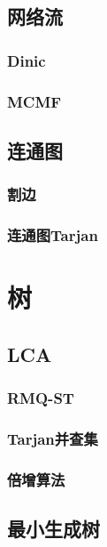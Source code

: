 \documentclass{ctexart}
\begin{document}
\subsection{网络流}
\subsubsection{Dinic}

\subsubsection{MCMF}

\subsection{连通图}
\subsubsection{割边}

\subsubsection{连通图Tarjan}




\section{树}
\subsection{LCA}
\subsubsection{RMQ-ST}

\subsubsection{Tarjan并查集}

\subsubsection{倍增算法}

\subsection{最小生成树}
\end{document}
